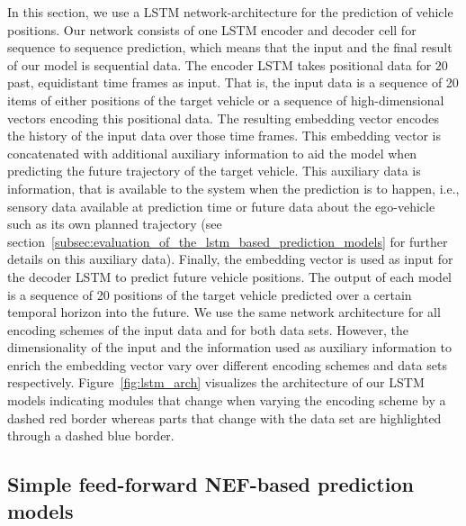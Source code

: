 In this section, we use a \acf{LSTM} \parencite{Hochreiter1997} network-architecture for the prediction of vehicle positions.
Our network consists of one \ac{LSTM} encoder and decoder cell for sequence to sequence prediction, which means that the input and the final result of our model is sequential data.
The encoder \ac{LSTM} takes positional data for $20$ past, equidistant time frames as input.
That is, the input data is a sequence of \num{20} items of either positions of the target vehicle or a sequence of high-dimensional vectors encoding this positional data.
The resulting embedding vector encodes the history of the input data over those time frames.
This embedding vector is concatenated with additional auxiliary information to aid the model when predicting the future trajectory of the target vehicle.
This auxiliary data is information, that is available to the system when the prediction is to happen, i.e., sensory data available at prediction time or future data about the ego-vehicle such as its own planned trajectory (see section~\ref{subsec:evaluation_of_the_lstm_based_prediction_models} for further details on this auxiliary data).
Finally, the embedding vector is used as input for the decoder \ac{LSTM} to predict future vehicle positions.
The output of each model is a sequence of \num{20} positions of the target vehicle predicted over a certain temporal horizon into the future.
We use the same network architecture for all encoding schemes of the input data and for both data sets.
However, the dimensionality of the input and the information used as auxiliary information to enrich the embedding vector vary over different encoding schemes and data sets respectively.
Figure~\ref{fig:lstm_arch} visualizes the architecture of our \ac{LSTM} models indicating modules that change when varying the encoding scheme by a dashed red border whereas parts that change with the data set are highlighted through a dashed blue border.

\subsection{Simple feed-forward \acs{NEF}-based prediction models}%
\label{subsec:simple_feed_forward_nef_based_prediction_models}

